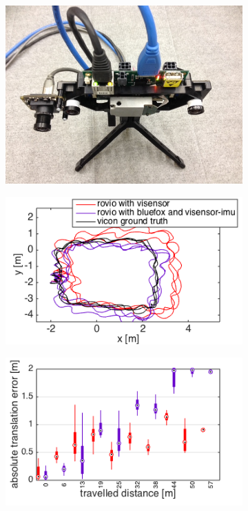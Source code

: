 \begin{figure}[h]
  \begin{subfigure}[b]{0.42\textwidth}
    \includegraphics[width=\textwidth]{images/vi_bluefox.JPG}
    \caption{}
  \end{subfigure}
  \hfill
  \begin{subfigure}[b]{0.42\textwidth}
    \includegraphics[width=\textwidth]{images/fast_fixed_2D.png}
    \caption{}
  \end{subfigure}
  \hfill
  \begin{subfigure}[b]{0.42\textwidth}
    \includegraphics[width=\textwidth]{images/fast_fixed/fast_fixed_ate.png}

\end{subfigure}
\end{figure}
